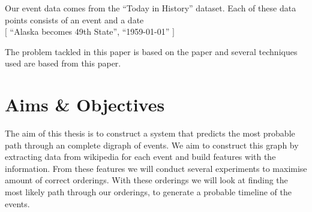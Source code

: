 \documentclass[bsc,frontabs,twoside,singlespacing,parskip,deptreport]{infthesis}     %
\begin{document}
Our event data comes from the ``Today in History'' dataset. Each of these data points consists
of an event and a date\\
$[$ ``Alaska becomes 49th State'', ``1959-01-01'' $]$


The problem tackled in this paper is based on the paper \cite{abend2015lexical} and several
techniques used are based from this paper. 




\section{Aims \& Objectives}

The aim of this thesis is to construct a system that predicts the most probable path
through an complete digraph of events.
We aim to construct this graph by extracting data from wikipedia for each event and
build features with the information. From these features we will conduct several experiments
to maximise amount of correct orderings. With these orderings we will look at finding
the most likely path through our orderings, to generate a probable timeline of the events.


\end{document}
